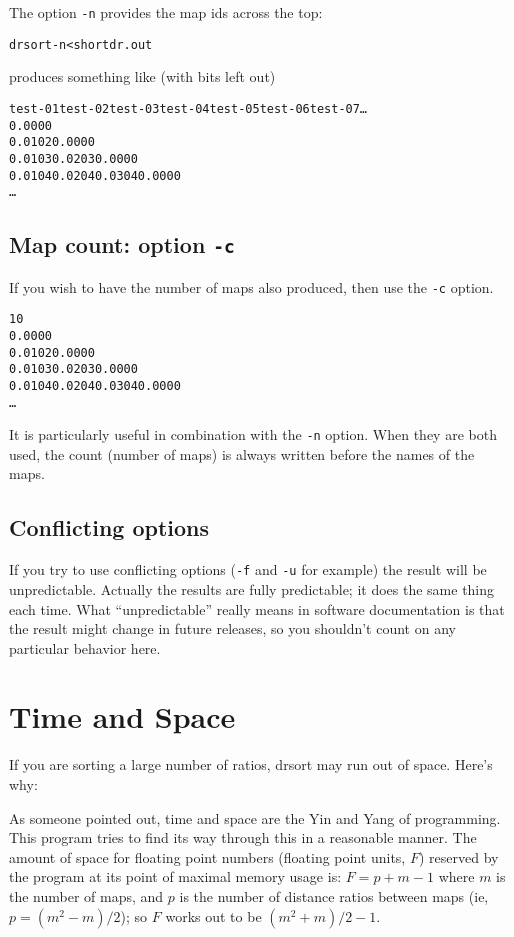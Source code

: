 \documentclass[%
	11pt,
        a4paper,
        twoside]{workrep}
\newcommand*{\prg}[1]{\textsf{#1}}		%
\newcommand*{\opt}[1]{\texttt{#1}}		%
\begin{document}
The option \opt{-n} provides the map ids across the top:
\begin{alltt}
  drsort -n < shortdr.out
\end{alltt}
produces something like (with bits left out)
\begin{alltt}\small
test-01 test-02 test-03 test-04 test-05 test-06 test-07\ldots
 0.0000
 0.0102 0.0000
 0.0103 0.0203 0.0000
 0.0104 0.0204 0.0304 0.0000
 \ldots
\end{alltt}

\subsection{Map count: option \opt{-c}}

If you wish to have the number of maps also produced, then use
the \opt{-c} option.
\begin{alltt}\small
10
 0.0000
 0.0102 0.0000
 0.0103 0.0203 0.0000
 0.0104 0.0204 0.0304 0.0000
 \ldots
\end{alltt}
It is particularly useful in combination with the \opt{-n} option.
When they are both used, the count (number of maps) is always
written before the names of the maps.

\subsection{Conflicting options}

If you try to use conflicting options (\opt{-f} and \opt{-u} for example) the
result will be unpredictable.  Actually the results are fully
predictable; it does the same thing each time.  What ``unpredictable''
really means in software documentation is that the result might
change in future releases, so you shouldn't count on any particular
behavior here.


\section{Time and Space}

If you are sorting a large number of ratios, \prg{drsort} may
run out of space.  Here's why:

As someone pointed out, time and space are the Yin and Yang of
programming.  This program tries to find its way through this
in a reasonable manner.  The amount of space for floating
point numbers (floating point units, $F$)
reserved by the program at its point of maximal memory usage is:
$F = p + m - 1$
where $m$ is the number of maps, and $p$ is the number of
distance ratios between maps (ie, $p= (m^2-m)/2$); so
$F$ works out to be $(m^2+m)/2 -1$.
\end{document}
